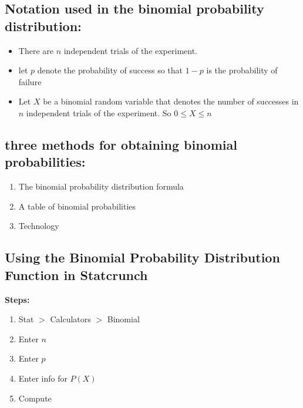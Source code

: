 \documentclass{report}
\begin{document}
      \bigbreak \noindent \bigbreak \noindent 
      \subsection*{Notation used in the binomial probability distribution:}
      \bigbreak \noindent 
      \begin{itemize}
          \item There are $n $ independent trials of the experiment.
        \item let $p $ denote the probability of success so that $1-p $ is the probability of failure
        \item Let $X $ be a binomial random variable that denotes the number of successes in $n $ independent trials of the experiment. So $0 \leq X \leq n $
      \end{itemize}

      \bigbreak \noindent \bigbreak \noindent 
      \subsection*{three methods for obtaining binomial probabilities:}
      \bigbreak \noindent 
            \begin{enumerate}
          \item The binomial probability distribution formula
          \item A table of binomial probabilities
          \item Technology
      \end{enumerate}

      \pagebreak 
      \subsection*{Using the Binomial Probability Distribution Function in Statcrunch}
      \bigbreak \noindent 
            \textbf{Steps:}
      \begin{enumerate}
          \item Stat $> $ Calculators $> $ Binomial
        \item Enter $n $
        \item Enter $p $
        \item Enter info for $P(X)$
        \item Compute
      \end{enumerate}
\end{document}
